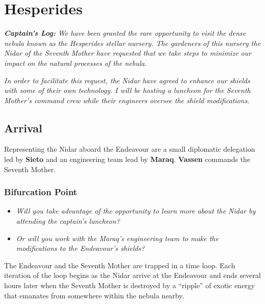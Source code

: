 \documentclass[11pt, a5paper, parskip=half-, DIV=12]{scrartcl}
\begin{document}
\section*{Hesperides}
\textit{\textbf{Captain's Log:} We have been granted the rare opportunity to visit the dense nebula known as the Hesperides stellar nursery. The gardeners of this nursery \textemdash{} the Nidar of the Seventh Mother \textemdash{} have requested that we take steps to minimize our impact on the natural processes of the nebula.}

\textit{In order to facilitate this request, the Nidar have agreed to enhance our shields with some of their own technology. I will be hosting a luncheon for the Seventh Mother's command crew while their engineers oversee the shield modifications.}

\subsection*{Arrival}
Representing the Nidar aboard the Endeavour are a small diplomatic delegation led by \textbf{Sieto} and an engineering team lead by \textbf{Maraq}.
\textbf{Vassen} commands the Seventh Mother.

\subsubsection*{Bifurcation Point}
\begin{itemize}
	\item \textit{Will you take advantage of the opportunity to learn more about the Nidar by attending the captain's luncheon?} 
	\item \textit{Or will you work with the Maraq's engineering team to make the modifications to the Endeavour's shields?} 
\end{itemize}

The Endeavour and the Seventh Mother are trapped in a time loop. Each iteration of the loop begins as the Nidar arrive at the Endeavour and ends several hours later when the Seventh Mother is destroyed by a ``ripple'' of exotic energy that emanates from somewhere within the nebula nearby.

\end{document}
